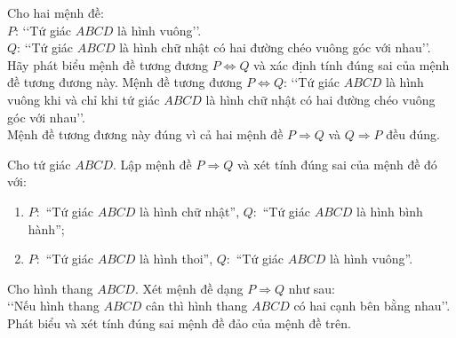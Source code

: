 \begin{bt}%
	Cho hai mệnh đề:\\
	$P$: \lq\lq Tứ giác $ABCD$ là hình vuông\rq\rq.\\
	$Q$: \lq\lq Tứ giác $ABCD$ là hình chữ nhật có hai đường chéo vuông góc với nhau\rq\rq.\\
	Hãy phát biểu mệnh đề tương đương $ P \Leftrightarrow Q$ và xác định tính đúng sai của mệnh đề tương đương này.
	\loigiai
	{
		Mệnh đề tương đương $ P \Leftrightarrow Q$: \lq\lq 	Tứ giác $ABCD$ là hình vuông khi và chỉ khi tứ giác $ABCD$ là hình chữ nhật có hai đường chéo vuông góc với nhau\rq\rq. \\
		Mệnh đề tương đương này đúng vì cả hai mệnh đề $P \Rightarrow Q$ và $Q \Rightarrow P$ đều đúng.
	}
	
\end{bt}

\begin{bt}%
	Cho tứ giác $ABCD$. Lập mệnh đề $P\Rightarrow Q$ và xét tính đúng sai của mệnh đề đó với:
	\begin{enumerate}
		\item $P\colon$ ``Tứ giác $ABCD$ là hình chữ nhật'', $Q\colon$ ``Tứ giác $ABCD$ là hình bình hành'';
		\item $P\colon$ ``Tứ giác $ABCD$ là hình thoi'', $Q\colon$ ``Tứ giác $ABCD$ là hình vuông''.
	\end{enumerate}
\end{bt}

\begin{bt}%
	Cho hình thang $ABCD$. Xét mệnh đề dạng $P \Rightarrow Q$ như sau:\\
	\lq\lq Nếu hình thang $ABCD$ cân thì hình thang $ABCD$ có hai cạnh bên bằng nhau\rq\rq.\\
	Phát biểu và xét tính đúng sai mệnh đề đảo của mệnh đề trên.
\end{bt}

